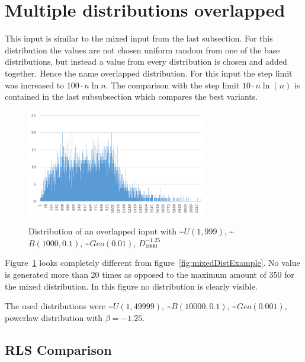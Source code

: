 \section{Multiple distributions overlapped}
This input is similar to the mixed input from the last subsection.
For this distribution the values are not chosen uniform random from one of the base distributions, but instead a value from every distribution is chosen and added together.
Hence the name overlapped distribution.
For this input the step limit was increased to $100\cdot n \ln n$.
The comparison with the step limit $10\cdot n \ln(n)$ is contained in the last subsubsection which compares the best variants.

\begin{figure}[h]
      \caption{Distribution of an overlapped input with \textasciitilde$U(1,999)$, \textasciitilde$B(1000,0.1)$, \textasciitilde$Geo(0.01)$, $D^{-1.25}_{1000}$}
      \centering
      \includegraphics[width=0.7\textwidth]{figures/images/numberGenerator/overlapped.png}\label{fig:overlappedDistExample}
\end{figure}

Figure~\ref{fig:overlappedDistExample} looks completely different from figure~\ref{fig:mixedDistExample}.
No value is generated more than 20 times as opposed to the maximum amount of 350 for the mixed distribution.
In this figure no distribution is clearly visible.

The used distributions were \textasciitilde$U(1,49999)$, \textasciitilde$B(10000,0.1)$, \textasciitilde$Geo(0.001)$, powerlaw distribution with $\beta=-1.25$.
\subsection{RLS Comparison}




